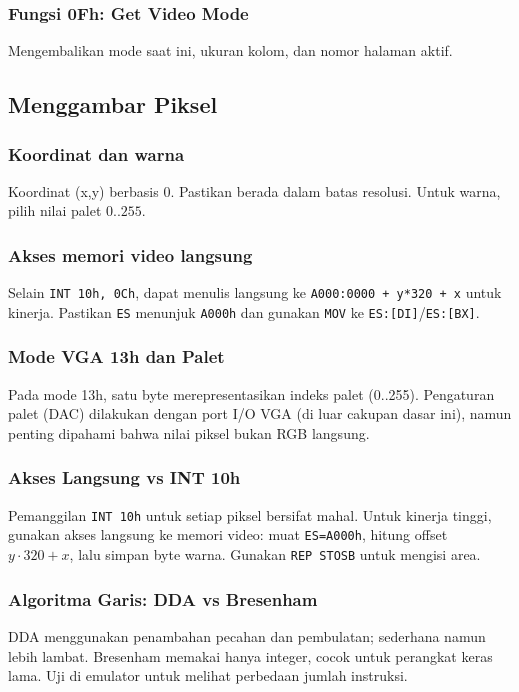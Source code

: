 \documentclass[../main.tex]{subfiles}
\begin{document}
            \subsubsection{Fungsi 0Fh: Get Video Mode}
                Mengembalikan mode saat ini, ukuran kolom, dan nomor halaman aktif.

        \subsection{Menggambar Piksel}
            \subsubsection{Koordinat dan warna}
                Koordinat (x,y) berbasis 0. Pastikan berada dalam batas resolusi. Untuk warna, pilih nilai palet \(0..255\).

            \subsubsection{Akses memori video langsung}
                Selain \texttt{INT 10h, 0Ch}, dapat menulis langsung ke \texttt{A000:0000 + y*320 + x} untuk kinerja. Pastikan \texttt{ES} menunjuk \texttt{A000h} dan gunakan \texttt{MOV} ke \texttt{ES:[DI]}/\texttt{ES:[BX]}.

            \subsubsection{Mode VGA 13h dan Palet}
                Pada mode 13h, satu byte merepresentasikan indeks palet (0..255). Pengaturan palet (DAC) dilakukan dengan port I/O VGA (di luar cakupan dasar ini), namun penting dipahami bahwa nilai piksel bukan RGB langsung.

            \subsubsection{Akses Langsung vs INT 10h}
                Pemanggilan \texttt{INT 10h} untuk setiap piksel bersifat mahal. Untuk kinerja tinggi, gunakan akses langsung ke memori video: muat \texttt{ES=A000h}, hitung offset \(y\cdot 320 + x\), lalu simpan byte warna. Gunakan \texttt{REP STOSB} untuk mengisi area.

            \subsubsection{Algoritma Garis: DDA vs Bresenham}
                DDA menggunakan penambahan pecahan dan pembulatan; sederhana namun lebih lambat. Bresenham memakai hanya integer, cocok untuk perangkat keras lama. Uji di emulator untuk melihat perbedaan jumlah instruksi.
\end{document}

